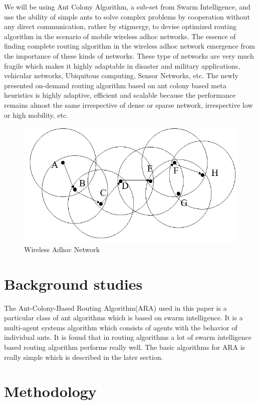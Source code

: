 We will be using Ant Colony Algorithm, a sub-set from Swarm Intelligence, and  use the ability of simple ants to solve complex problems by cooperation without any direct communication, rather by stigmergy, to devise optimized routing algorithm in the scenario of mobile wireless adhoc networks. The essence of finding complete routing algorithm in the wireless adhoc network emergence from the importance of these kinds of networks. These type of networks are very much fragile which makes it highly adaptable in disaster and military applications, vehicular networks, Ubiquitous computing, Sensor Networks, etc. The newly presented on-demand routing algorithm based on ant colony based meta heuristics is highly adaptive, efficient and scalable because the performance remains almost the same irrespective of dense or sparse network, irrespective low or high mobility, etc. 

\begin{figure}
    \centering
    \includegraphics[scale=0.5]{adhoc}
    \caption{Wireless Adhoc Network}
    \label{adhoc}
\end{figure}

\section{Background studies}
The Ant-Colony-Based Routing Algorithm(ARA) used in this paper is a particular class of ant algorithms which is based on swarm intelligence. It is a multi-agent systems algorithm which consists of agents with the behavior of individual ants. It is found that in routing algorithms a lot of swarm intelligence based routing algorithm performs really well. The basic algorithms for ARA is really simple which is described in the later section.


\section{Methodology}

